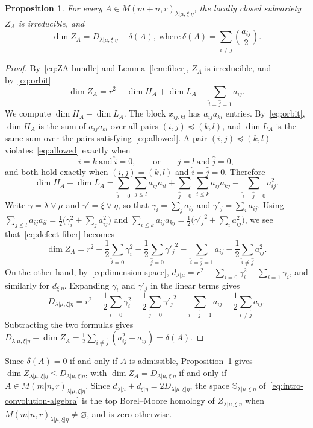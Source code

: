 \documentclass[11pt,a4paper]{amsart}
\newtheorem{proposition}[theorem]{Proposition}
\theoremstyle{definition}
\theoremstyle{remark}
\newcommand{\bS}{\mathbb S}
\newcommand{\lm}{\lambda|\mu}
\newcommand{\xh}{\xi|\eta}
\newcommand{\Mat}{M(m+n,r)}
\newcommand{\Smat}{M(m|n,r)}
\numberwithin{equation}{section}
\begin{document}
\begin{proposition}\label{prop:defect}
For every $A\in\Mat_{\lm,\xh}$, the locally closed subvariety $Z_A$
is irreducible, and
\begin{equation}\label{eq:defect}
\dim Z_A=D_{\lm,\xh}-\delta(A),
\ \text{where}\
\delta(A)=\sum_{\widehat i\ne\widehat j}\binom{a_{ij}}2.
\end{equation}
\end{proposition}
\begin{proof}
By~\eqref{eq:ZA-bundle} and Lemma~\ref{lem:fiber}, $Z_A$ is irreducible,
and by~\eqref{eq:orbit}
\begin{equation}\label{eq:defect-fiber}
\dim Z_A=r^2-\dim H_A+\dim L_A-\sum_{\widehat i=\widehat j=1}a_{ij}.
\end{equation}
We compute $\dim H_A-\dim L_A$. The block $x_{ij,kl}$ has
$a_{ij}a_{kl}$ entries. By~\eqref{eq:orbit}, $\dim H_A$ is the sum of
$a_{ij}a_{kl}$ over all pairs $(i,j)\preceq(k,l)$, and $\dim L_A$ is the
same sum over the pairs satisfying~\eqref{eq:allowed}. A pair
$(i,j)\preceq(k,l)$ violates~\eqref{eq:allowed} exactly when
$$
i=k\ \text{and}\ \widehat i=0,\qquad\text{or}\qquad
j=l\ \text{and}\ \widehat j=0,
$$
and both hold exactly when $(i,j)=(k,l)$ and $\widehat i=\widehat j=0$.
Therefore
$$
\dim H_A-\dim L_A=\sum_{\widehat i=0}\ \sum_{j\le l}a_{ij}a_{il}
+\sum_{\widehat j=0}\ \sum_{i\le k}a_{ij}a_{kj}
-\sum_{\widehat i=\widehat j=0}a_{ij}^2 .
$$
Write $\gamma=\lambda\vee\mu$ and $\gamma'=\xi\vee\eta$, so that
$\gamma_i=\sum_ja_{ij}$ and $\gamma'_j=\sum_ia_{ij}$. Using
$\sum_{j\le l}a_{ij}a_{il}=\frac12\bigl(\gamma_i^2+\sum_ja_{ij}^2\bigr)$
and
$\sum_{i\le k}a_{ij}a_{kj}=\frac12\bigl({\gamma'_j}^2+\sum_ia_{ij}^2\bigr)$,
we see that~\eqref{eq:defect-fiber} becomes
$$
\dim Z_A=r^2-\frac12\sum_{\widehat i=0}\gamma_i^2
-\frac12\sum_{\widehat j=0}{\gamma'_j}^2
-\sum_{\widehat i=\widehat j=1}a_{ij}
-\frac12\sum_{\widehat i\ne\widehat j}a_{ij}^2 .
$$
On the other hand, by~\eqref{eq:dimension-space},
$d_{\lm}=r^2-\sum_{\widehat i=0}\gamma_i^2-\sum_{\widehat i=1}\gamma_i$,
and similarly for $d_{\xh}$. Expanding $\gamma_i$ and $\gamma'_j$ in the
linear terms gives
$$
D_{\lm,\xh}=r^2-\frac12\sum_{\widehat i=0}\gamma_i^2
-\frac12\sum_{\widehat j=0}{\gamma'_j}^2
-\sum_{\widehat i=\widehat j=1}a_{ij}
-\frac12\sum_{\widehat i\ne\widehat j}a_{ij}.
$$
Subtracting the two formulas gives
$D_{\lm,\xh}-\dim Z_A=\frac12\sum_{\widehat i\ne\widehat j}(a_{ij}^2-a_{ij})
=\delta(A)$.
\end{proof}

Since $\delta(A)=0$ if and only if $A$ is admissible,
Proposition~\ref{prop:defect} gives $\dim Z_{\lm,\xh}\le D_{\lm,\xh}$, with
$\dim Z_A=D_{\lm,\xh}$ if and only if $A\in\Smat_{\lm,\xh}$. Since
$d_{\lm}+d_{\xh}=2D_{\lm,\xh}$, the space $\bS_{\lm,\xh}$
of~\eqref{eq:intro-convolution-algebra} is the top Borel--Moore homology of
$Z_{\lm,\xh}$ when $\Smat_{\lm,\xh}\ne\varnothing$, and is zero otherwise.
\end{document}
